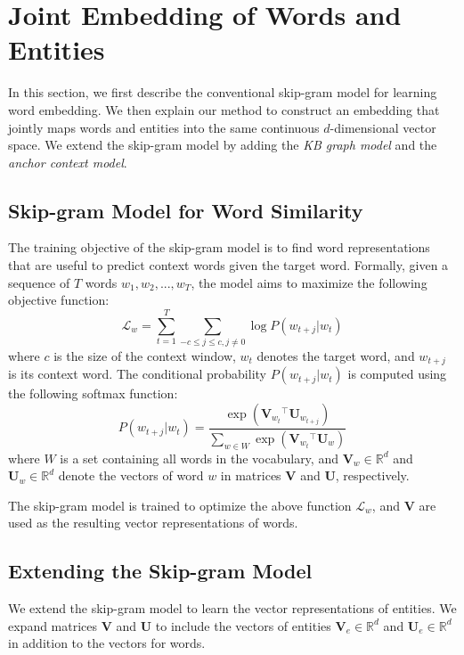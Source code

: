 \documentclass[11pt,letterpaper]{article}
\begin{document}
\section{Joint Embedding of Words and Entities}

In this section, we first describe the conventional skip-gram model for learning word embedding.
We then explain our method to construct an embedding that jointly maps words and entities into the same continuous $d$-dimensional vector space.
We extend the skip-gram model by adding the \textit{KB graph model} and the \textit{anchor context model}.

\subsection{Skip-gram Model for Word Similarity}
\label{subsec:skip-gram-model}

The training objective of the skip-gram model is to find word representations that are useful to predict context words given the target word.
Formally, given a sequence of $T$ words $w_1, w_2, ..., w_T$, the model aims to maximize the following objective function:
\begin{equation}
\mathcal{L}_w = \sum_{t=1}^{T}\sum_{-c \leq j \leq c,j \neq 0}\log P(w_{t+j}|w_t)
\label{objective_skipgram}
\end{equation}
where $c$ is the size of the context window, $w_t$ denotes the target word, and $w_{t+j}$ is its context word.
The conditional probability $P(w_{t+j}|w_t)$ is computed using the following softmax function:
\begin{equation}
P(w_{t+j}|w_t) = \frac{\exp(\mathbf{V}_{w_t}\!^\top \mathbf{U}_{w_{t+j}})}{\sum_{w \in W}\exp(\mathbf{V}_{w_t}\!^\top \mathbf{U}_w)}
\label{softmax_skipgram}
\end{equation}
where $W$ is a set containing all words in the vocabulary, and $\mathbf{V}_w \in \mathbb{R}^d$ and $\mathbf{U}_w \in \mathbb{R}^d$ denote the vectors of word $w$ in matrices $\mathbf{V}$ and $\mathbf{U}$, respectively.

The skip-gram model is trained to optimize the above function $\mathcal{L}_w$, and $\mathbf{V}$ are used as the resulting vector representations of words.

\subsection{Extending the Skip-gram Model}

We extend the skip-gram model to learn the vector representations of entities.
We expand matrices $\textbf{V}$ and $\textbf{U}$ to include the vectors of entities $\mathbf{V}_e \in \mathbb{R}^d$ and $\mathbf{U}_e \in \mathbb{R}^d$ in addition to the vectors for words.
\end{document}
